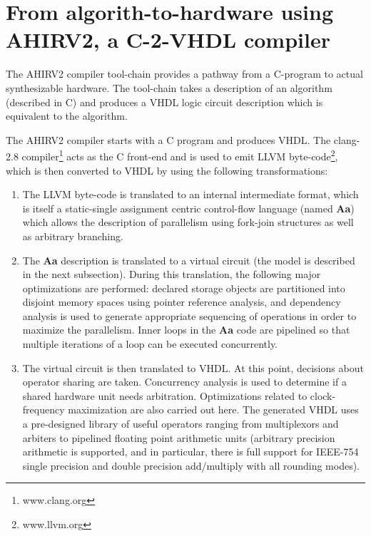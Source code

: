 \documentclass[conference]{IEEEtran}
\begin{document}
\section{From algorith-to-hardware using AHIRV2, a C-2-VHDL compiler} \label{s:AHIRV2}
The AHIRV2 compiler tool-chain \cite{c:ahir_thesis2009, c:ahir_dsd2010, c:ahir_usenix2012} 
provides a pathway from a C-program to actual synthesizable hardware.  The tool-chain
takes a description of an algorithm (described in C) and produces a VHDL logic circuit
description which is equivalent to the algorithm.

The AHIRV2 compiler starts with a C program and produces VHDL.  %
The clang-2.8 compiler\footnote{www.clang.org} %
acts as the C front-end
and is used to emit LLVM byte-code\footnote{www.llvm.org}, 
which is then converted to VHDL by using the following transformations:
\begin{enumerate}
\item The LLVM byte-code is translated to an internal intermediate
format, which is itself a static-single assignment centric 
control-flow language (named {\bf Aa}) which allows the description of parallelism
using fork-join structures as well as arbitrary branching.
\item The {\bf Aa} description is translated to a virtual circuit (the model
is described in the next subsection).  During this translation, the
following major optimizations
are performed:  declared storage objects are partitioned into disjoint memory
spaces using pointer reference analysis, and dependency analysis is used to
generate appropriate sequencing of operations in order to maximize the 
parallelism.  Inner loops in the {\bf Aa} code are pipelined so that
multiple iterations of a loop can be executed concurrently.  
\item The virtual circuit is then translated to VHDL.  At this point,
decisions about operator sharing are taken.  Concurrency analysis is
used to determine if a shared hardware unit needs arbitration. Optimizations
related to clock-frequency maximization are also carried out here.
The generated VHDL uses a pre-designed library of useful operators ranging from
multiplexors and arbiters to pipelined floating point arithmetic units (arbitrary
precision arithmetic is supported, and in particular, there is
full support for IEEE-754 single precision and double precision add/multiply with
all rounding modes).
\end{enumerate}
\end{document}
